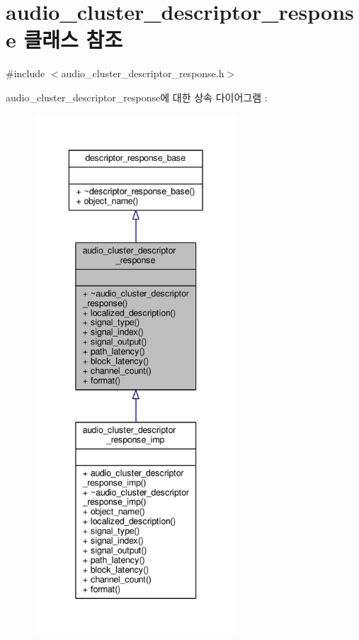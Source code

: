 \hypertarget{classavdecc__lib_1_1audio__cluster__descriptor__response}{}\section{audio\+\_\+cluster\+\_\+descriptor\+\_\+response 클래스 참조}
\label{classavdecc__lib_1_1audio__cluster__descriptor__response}


{\ttfamily \#include $<$audio\+\_\+cluster\+\_\+descriptor\+\_\+response.\+h$>$}



audio\+\_\+cluster\+\_\+descriptor\+\_\+response에 대한 상속 다이어그램 \+: 
\nopagebreak
\begin{figure}[H]
\begin{center}
\leavevmode
\includegraphics[height=550pt]{classavdecc__lib_1_1audio__cluster__descriptor__response__inherit__graph}
\end{center}
\end{figure}


